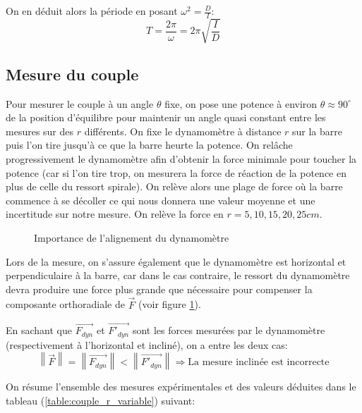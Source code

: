 \documentclass[12pt]{article}
\begin{document}
On en déduit alors la période en posant $\omega^2 = \frac{D}{I}$:
\begin{equation}
    T = \frac{2\pi}{\omega} = 2\pi \sqrt{\frac{I}{D}}
    \label{eqn:periode}
\end{equation}

\subsection{Mesure du couple}
\label{couple_constant}

Pour mesurer le couple à un angle $\theta$ fixe, on pose une potence à environ $\theta \approx 90^{\circ}$ de la position d'équilibre pour maintenir un angle
quasi constant entre les mesures sur des $r$ différents. On fixe le dynamomètre à distance $r$ sur la barre puis l'on tire jusqu'à ce que la barre heurte la potence.
On relâche progressivement le dynamomètre afin d'obtenir la force minimale pour toucher la potence (car si l'on tire trop, on mesurera la force de réaction de la potence en plus de celle du ressort spirale).
On relève alors une plage de force où la barre commence à se décoller ce qui nous donnera une valeur moyenne et une incertitude sur notre mesure. On relève la force en $r=5, 10, 15, 20, 25cm$.

\begin{figure}[!h]
    \begin{center}
        \resizebox{0.5\textwidth}{3cm}{
            
        }
    \end{center}
    \caption{Importance de l'alignement du dynamomètre}
    \label{fig:horizontal}
\end{figure}

Lors de la mesure, on s'assure également que le dynamomètre est horizontal et perpendiculaire à la barre, car dans le cas contraire, le ressort du dynamomètre
devra produire une force plus grande que nécessaire pour compenser la composante orthoradiale de $\vec{F}$ (voir figure \ref{fig:horizontal}).

En sachant que $\vec{F_{dyn}}$ et $\vec{F'_{dyn}}$ sont les forces mesurées par le dynamomètre (respectivement à l'horizontal et incliné), on a entre les deux cas:
\begin{equation}
    \left\lVert \vec{F} \right\rVert = \left\lVert \vec{F_{dyn}} \right\rVert < \left\lVert \vec{F'_{dyn}} \right\rVert \Rightarrow \text{La mesure inclinée est incorrecte}
\end{equation}

On résume l'ensemble des mesures expérimentales et des valeurs déduites dans le tableau (\ref{table:couple_r_variable}) suivant:
\end{document}
